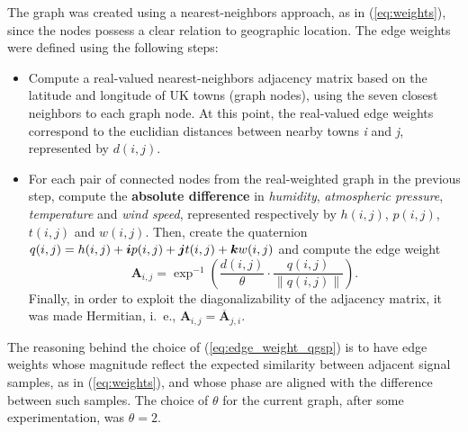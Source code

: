 The graph was created using a nearest-neighbors approach, as in (\ref{eq:weights}), since the nodes possess a clear relation to geographic location. The edge weights were defined using the following steps:
\begin{itemize}[noitemsep]
\item Compute a real-valued nearest-neighbors adjacency matrix based on the latitude and longitude of UK towns (graph nodes), using the seven closest neighbors to each graph node. At this point, the real-valued edge weights correspond to the euclidian distances between nearby towns \textit{i} and \textit{j}, represented by ${d}(i, j)$.
\item For each pair of connected nodes from the real-weighted graph in the previous step, compute the \textbf{absolute difference} in \textit{humidity}, \textit{atmospheric pressure}, \textit{temperature} and \textit{wind speed}, represented respectively by ${h}(i, j)$, $p(i, j)$, ${t}(i, j)$ and ${w}(i, j)$. Then, create the quaternion $q(i, j) = {h}(i, j) + \boldsymbol{i} {p}(i, j) + \boldsymbol{j} {t}(i, j) + \boldsymbol{k} {w}(i, j)$ and compute the edge weight
\begin{equation}
\label{eq:edge_weight_qgsp}
\mathbf{A}_{i, j} = \exp^{-1} \left(
\frac{d(i, j)}{\theta} \cdot 
\frac{q(i, j)}{\parallel q(i, j) \parallel}
\right).
\end{equation}
Finally, in order to exploit the diagonalizability of the adjacency matrix, it was made Hermitian, i.~e., $\mathbf{A}_{i, j} = \overline{\mathbf{A}}_{j, i}$.
\end{itemize}

The reasoning behind the choice of (\ref{eq:edge_weight_qgsp}) is to have edge weights whose magnitude reflect the expected similarity between adjacent signal samples, as in (\ref{eq:weights}), and whose phase are aligned with the difference between such samples. The choice of $\theta$ for the current graph, after some experimentation, was $\theta = 2$.


